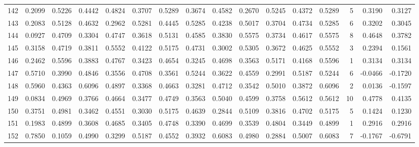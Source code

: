 \begin{tabular}{lrrrrrrrrrrrrrrr}
142 &      0.2099 &  0.5226 &  0.4442 &  0.4824 &  0.3707 &  0.5289 &  0.3674 &  0.4582 &  0.2670 &  0.5245 &   0.4372 &     0.5289 &      5 &                    0.3190 &                     0.3127 \\
143 &      0.2083 &  0.5128 &  0.4632 &  0.2962 &  0.5281 &  0.4445 &  0.5285 &  0.4238 &  0.5017 &  0.3704 &   0.4734 &     0.5285 &      6 &                    0.3202 &                     0.3045 \\
144 &      0.0927 &  0.4709 &  0.3304 &  0.4747 &  0.3618 &  0.5131 &  0.4585 &  0.3830 &  0.5575 &  0.3734 &   0.4617 &     0.5575 &      8 &                    0.4648 &                     0.3782 \\
145 &      0.3158 &  0.4719 &  0.3811 &  0.5552 &  0.4122 &  0.5175 &  0.4731 &  0.3002 &  0.5305 &  0.3672 &   0.4625 &     0.5552 &      3 &                    0.2394 &                     0.1561 \\
146 &      0.2462 &  0.5596 &  0.3883 &  0.4767 &  0.3423 &  0.4654 &  0.3245 &  0.4698 &  0.3563 &  0.5171 &   0.4168 &     0.5596 &      1 &                    0.3134 &                     0.3134 \\
147 &      0.5710 &  0.3990 &  0.4846 &  0.3556 &  0.4708 &  0.3561 &  0.5244 &  0.3622 &  0.4559 &  0.2991 &   0.5187 &     0.5244 &      6 &                   -0.0466 &                    -0.1720 \\
148 &      0.5960 &  0.4363 &  0.6096 &  0.4897 &  0.3368 &  0.4663 &  0.3281 &  0.4712 &  0.3542 &  0.5010 &   0.3872 &     0.6096 &      2 &                    0.0136 &                    -0.1597 \\
149 &      0.0834 &  0.4969 &  0.3766 &  0.4664 &  0.3477 &  0.4749 &  0.3563 &  0.5040 &  0.4599 &  0.3758 &   0.5612 &     0.5612 &     10 &                    0.4778 &                     0.4135 \\
150 &      0.3751 &  0.4981 &  0.3462 &  0.4551 &  0.3030 &  0.5175 &  0.4639 &  0.2844 &  0.5109 &  0.3816 &   0.4702 &     0.5175 &      5 &                    0.1424 &                     0.1230 \\
151 &      0.1983 &  0.4899 &  0.3608 &  0.4685 &  0.3405 &  0.4748 &  0.3390 &  0.4699 &  0.3539 &  0.4804 &   0.3449 &     0.4899 &      1 &                    0.2916 &                     0.2916 \\
152 &      0.7850 &  0.1059 &  0.4990 &  0.3299 &  0.5187 &  0.4552 &  0.3932 &  0.6083 &  0.4980 &  0.2884 &   0.5007 &     0.6083 &      7 &                   -0.1767 &                    -0.6791 \\

\end{tabular}
